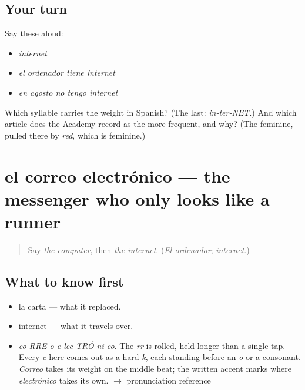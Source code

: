 \subsection*{Your turn}
Say these aloud:

\begin{itemize}
\raggedright
  \item \emph{internet}
  \item \emph{el ordenador tiene internet}
  \item \emph{en agosto no tengo internet}
\end{itemize}

\begin{tcolorbox}[breakable,colback=teal!4,colframe=teal!35!black,title={Before you move on}]
Which syllable carries the weight in Spanish? (The last: \emph{in-ter-NET}.) And which article does the Academy record as the more frequent, and why? (The feminine, pulled there by \emph{red}, which is feminine.)
\end{tcolorbox}
\section[el correo electrónico]{el correo electrónico — the messenger who only looks like a runner}

\label{lesson:ES-C393-correo-electronico}



\begin{quote}
Say \emph{the computer}, then \emph{the internet}. (\emph{El ordenador}; \emph{internet}.)
\end{quote}

\subsection*{What to know first}
\begin{itemize}
\raggedright
  \item la carta — what it replaced.
  \item internet — what it travels over.
\end{itemize}

\begin{sounds}
\begin{itemize}
\raggedright
  \item \emph{co-RRE-o e-lec-TRÓ-ni-co}. The \emph{rr} is rolled, held longer than a single tap. Every \emph{c} here comes out as a hard \emph{k}, each standing before an \emph{o} or a consonant. \emph{Correo} takes its weight on the middle beat; the written accent marks where \emph{electrónico} takes its own. $\to$ pronunciation reference
\end{itemize}
\end{sounds}

